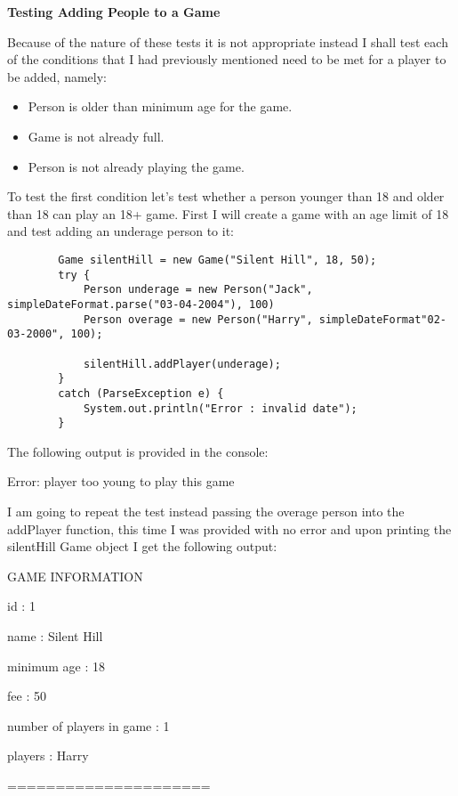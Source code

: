 \documentclass[a4paper]{article}
\begin{document}
\noindent \textbf{Testing Adding People to a Game}

Because of the nature of these tests it is not appropriate instead I shall test each of the conditions that I had previously mentioned need to be met for a player to be added, namely: \begin{itemize}
\item Person is older than minimum age for the game.
\item Game is not already full.
\item Person is not already playing the game.
\end{itemize}

To test the first condition let's test whether a person younger than 18 and older than 18 can play an 18+ game. First I will create a game with an age limit of 18 and test adding an underage person to it: \begin{lstlisting}
		Game silentHill = new Game("Silent Hill", 18, 50);
        try {
            Person underage = new Person("Jack", simpleDateFormat.parse("03-04-2004"), 100)
            Person overage = new Person("Harry", simpleDateFormat"02-03-2000", 100);

            silentHill.addPlayer(underage);
        }
        catch (ParseException e) {
            System.out.println("Error : invalid date");
        }
\end{lstlisting}
The following output is provided in the console: 

\noindent Error: player too young to play this game

I am going to repeat the test instead passing the overage person into the addPlayer function, this time I was provided with no error and upon printing the silentHill Game object I get the following output: \newline

\noindent GAME INFORMATION

\noindent id : 1

\noindent name : Silent Hill

\noindent minimum age : 18

\noindent fee : 50

\noindent number of players in game : 1

\noindent players : Harry 

\noindent =====================\newline
\end{document}
